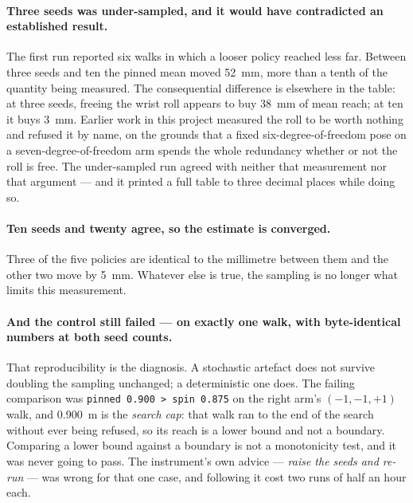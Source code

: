 \paragraph{Three seeds was under-sampled, and it would have contradicted an
established result.} The first run reported six walks in which a looser
policy reached less far. Between three seeds and ten the pinned mean moved
\SI{52}{\milli\metre}, more than a tenth of the quantity being measured. The
consequential difference is elsewhere in the table: at three seeds, freeing
the wrist roll appears to buy \SI{38}{\milli\metre} of mean reach; at ten it
buys \SI{3}{\milli\metre}. Earlier work in this project measured the roll to
be worth nothing and refused it by name, on the grounds that a fixed
six-degree-of-freedom pose on a seven-degree-of-freedom arm spends the whole
redundancy whether or not the roll is free. The under-sampled run agreed with
neither that measurement nor that argument --- and it printed a full table to
three decimal places while doing so.

\paragraph{Ten seeds and twenty agree, so the estimate is converged.} Three
of the five policies are identical to the millimetre between them and the
other two move by \SI{5}{\milli\metre}. Whatever else is true, the sampling
is no longer what limits this measurement.

\paragraph{And the control still failed --- on exactly one walk, with
byte-identical numbers at both seed counts.} That reproducibility is the
diagnosis. A stochastic artefact does not survive doubling the sampling
unchanged; a deterministic one does. The failing comparison was
\texttt{pinned \num{0.900} > spin \num{0.875}} on the right arm's
$(-1,-1,+1)$ walk, and \SI{0.900}{\metre} is the \emph{search cap}: that walk
ran to the end of the search without ever being refused, so its reach is a
lower bound and not a boundary. Comparing a lower bound against a boundary is
not a monotonicity test, and it was never going to pass. The instrument's own
advice --- \emph{raise the seeds and re-run} --- was wrong for that one case,
and following it cost two runs of half an hour each.

